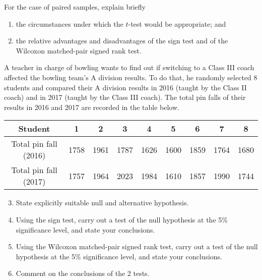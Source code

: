 \begin{problem}
    For the case of paired samples, explain briefly
    \begin{enumerate}
        \item the circumstances under which the $t$-test would be appropriate; and
        \item the relative advantages and disadvantages of the sign test and of the Wilcoxon matched-pair signed rank test.
    \end{enumerate}

    A teacher in charge of bowling wants to find out if switching to a Class III coach affected the bowling team's A division results. To do that, he randomly selected 8 students and compared their A division results in 2016 (taught by the Class II coach) and in 2017 (taught by the Class III coach). The total pin falls of their results in 2016 and 2017 are recorded in the table below.

    \begin{table}[H]
        \centering
        \begin{tabular}{|c|c|c|c|c|c|c|c|c|}
        \hline
        Student & 1 & 2 & 3 & 4 & 5 & 6 & 7 & 8 \\ \hline
        Total pin fall (2016) & 1758 & 1961 & 1787 & 1626 & 1600 & 1859 & 1764 & 1680 \\ \hline
        Total pin fall (2017) & 1757 & 1964 & 2023 & 1984 & 1610 & 1857 & 1990 & 1744 \\ \hline
        \end{tabular}
    \end{table}

    \begin{enumerate}
        \setcounter{enumi}{2}
        \item State explicitly suitable null and alternative hypothesis.
        \item Using the sign test, carry out a test of the null hypothesis at the 5\% significance level, and state your conclusions.
        \item Using the Wilcoxon matched-pair signed rank test, carry out a test of the null hypothesis at the 5\% significance level, and state your conclusions.
        \item Comment on the conclusions of the 2 tests.
    \end{enumerate}
\end{problem}
